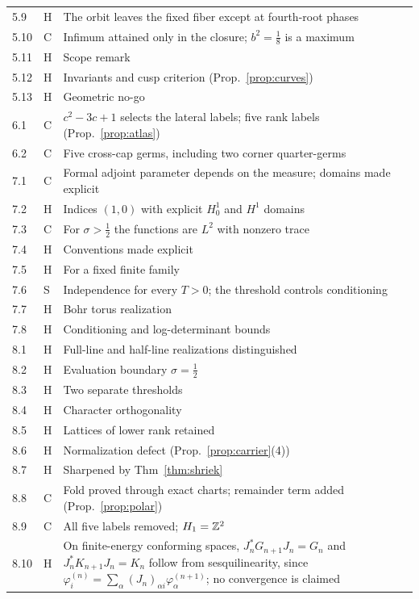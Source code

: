 \documentclass[11pt]{article}
\theoremstyle{definition}\newtheorem{definition}[theorem]{Definition}
\theoremstyle{remark}\newtheorem{remark}[theorem]{Remark}
\begin{document}
{\begin{longtable}{@{}l>{\raggedright\arraybackslash}p{.06\linewidth}>{\raggedright\arraybackslash}p{.72\linewidth}@{}}
5.9 & H & The orbit leaves the fixed fiber except at fourth-root phases\\
5.10 & C & Infimum attained only in the closure; $b^2=\frac18$ is a maximum\\
5.11 & H & Scope remark\\
5.12 & H & Invariants and cusp criterion (Prop.~\ref{prop:curves})\\
5.13 & H & Geometric no-go\\
6.1 & C & $c^2-3c+1$ selects the lateral labels; five rank labels (Prop.~\ref{prop:atlas})\\
6.2 & C & Five cross-cap germs, including two corner quarter-germs\\
7.1 & C & Formal adjoint parameter depends on the measure; domains made explicit\\
7.2 & H & Indices $(1,0)$ with explicit $H^1_0$ and $H^1$ domains\\
7.3 & C & For $\sigma>\frac12$ the functions are $L^2$ with nonzero trace\\
7.4 & H & Conventions made explicit\\
7.5 & H & For a fixed finite family\\
7.6 & S & Independence for every $T>0$; the threshold controls conditioning\\
7.7 & H & Bohr torus realization\\
7.8 & H & Conditioning and log-determinant bounds\\
8.1 & H & Full-line and half-line realizations distinguished\\
8.2 & H & Evaluation boundary $\sigma=\frac12$\\
8.3 & H & Two separate thresholds\\
8.4 & H & Character orthogonality\\
8.5 & H & Lattices of lower rank retained\\
8.6 & H & Normalization defect (Prop.~\ref{prop:carrier}(4))\\
8.7 & H & Sharpened by Thm~\ref{thm:shriek}\\
8.8 & C & Fold proved through exact charts; remainder term added (Prop.~\ref{prop:polar})\\
8.9 & C & All five labels removed; $H_1=\mathbb Z^2$\\
8.10 & H & On finite-energy conforming spaces, $J_n^*G_{n+1}J_n=G_n$ and $J_n^*K_{n+1}J_n=K_n$ follow from sesquilinearity, since $\varphi^{(n)}_i=\sum_\alpha(J_n)_{\alpha i}\varphi^{(n+1)}_\alpha$; no convergence is claimed\\

\end{longtable}}
\end{document}
